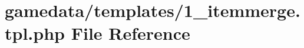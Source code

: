 \hypertarget{1__itemmerge_8tpl_8php}{\section{gamedata/templates/1\+\_\+itemmerge.tpl.\+php File Reference}
\label{1__itemmerge_8tpl_8php}
}
